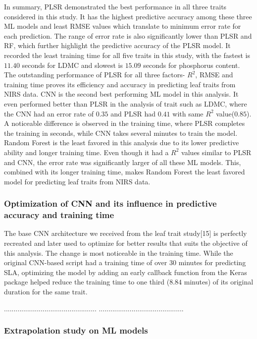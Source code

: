 \documentclass[12pt,a4paper]{report}
\begin{document}
In summary, PLSR demonstrated the best performance in all three traits considered in this study. It has the highest predictive accuracy among these three ML models and least RMSE values which translate to minimum error rate for each prediction. The range of error rate is also significantly lower than PLSR and RF, which further highlight the predictive accuracy of the PLSR model. It recorded the least training time for all five traits in this study, with the fastest is $11.40$ seconds for LDMC and slowest is $15.09$ seconds for phosphorus content. The outstanding performance of PLSR for all three factors- $R^2$, RMSE and training time proves its efficiency and accuracy in predicting leaf traits from NIRS data. CNN is the second best performing ML model in this analysis. It even performed better than PLSR in the analysis of trait such as LDMC, where the CNN had an error rate of $0.35$ and PLSR had $0.41$  with same $R^2$ value($0.85$). A noticeable difference is observed in the training time, where PLSR completes the training in seconds, while CNN takes several minutes to train the model. Random Forest is the least favored in this analysis due to its lower predictive ability and longer training time. Even though it had a $R^2$ values similar to PLSR and CNN, the error rate was significantly larger of all these ML models. This, combined with its longer training time, makes Random Forest the least favored model for predicting leaf traits from NIRS data. \\


\subsubsection*{Optimization of CNN and its influence in predictive accuracy and training time}
The base CNN architecture we received from the leaf trait study[15] is perfectly recreated and later used to optimize for better results that suits the objective of this analysis. The change is most noticeable in the training time. While the original CNN-based script had a training time of over $30$ minutes for predicting SLA, optimizing the model by adding an early callback function from the Keras package helped reduce the training time to one third ($8.84$ minutes) of its original duration for the same trait. 

................................................
............................................

\subsubsection*{Extrapolation study on ML models}
\end{document}
